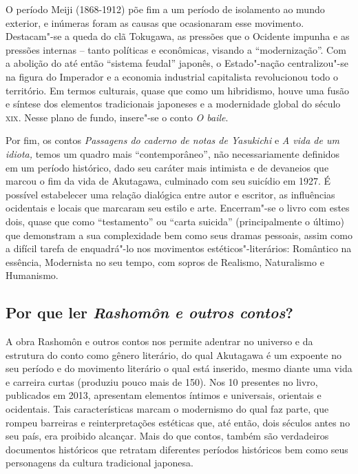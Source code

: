 \documentclass[12pt]{extarticle}
\begin{document}
O período Meiji (1868-1912) põe fim a um período de isolamento ao mundo
exterior, e inúmeras foram as causas que ocasionaram esse movimento.
Destacam"-se a queda do clã Tokugawa, as pressões que o Ocidente impunha
e as pressões internas -- tanto políticas e econômicas, visando a
``modernização''. Com a abolição do até então ``sistema feudal''
japonês, o Estado"-nação centralizou"-se na figura do Imperador e a
economia industrial capitalista revolucionou todo o território. Em
termos culturais, quase que como um hibridismo, houve uma fusão e
síntese dos elementos tradicionais japoneses e a modernidade global do
século \textsc{xix}. Nesse plano de fundo, insere"-se o conto \emph{O baile}.

Por fim, os contos \emph{Passagens do caderno de notas de Yasukichi} e
\emph{A vida de um idiota,} temos um quadro mais ``contemporâneo'', não
necessariamente definidos em um período histórico, dado seu caráter mais
intimista e de devaneios que marcou o fim da vida de Akutagawa,
culminado com seu suicídio em 1927. É possível estabelecer uma relação
dialógica entre autor e escritor, as influências ocidentais e locais que
marcaram seu estilo e arte. Encerram"-se o livro com estes dois, quase
que como ``testamento'' ou ``carta suicida'' (principalmente o último)
que demonstram a sua complexidade bem como seus dramas pessoais, assim
como a difícil tarefa de enquadrá"-lo nos movimentos
estéticos"-literários: Romântico na essência, Modernista no seu tempo,
com sopros de Realismo, Naturalismo e Humanismo.

\subsection{Por que ler \textit{Rashomôn e outros contos}?}

A obra Rashomôn e outros contos nos permite adentrar no universo e da
estrutura do conto como gênero literário, do qual Akutagawa é um
expoente no seu período e do movimento literário o qual está inserido,
mesmo diante uma vida e carreira curtas (produziu pouco mais de 150).
Nos 10 presentes no livro, publicados em 2013, apresentam elementos
íntimos e universais, orientais e ocidentais. Tais características
marcam o modernismo do qual faz parte, que rompeu barreiras e
reinterpretações estéticas que, até então, dois séculos antes no seu
país, era proibido alcançar. Mais do que contos, também são verdadeiros
documentos históricos que retratam diferentes períodos históricos bem
como seus personagens da cultura tradicional japonesa.
\end{document}
